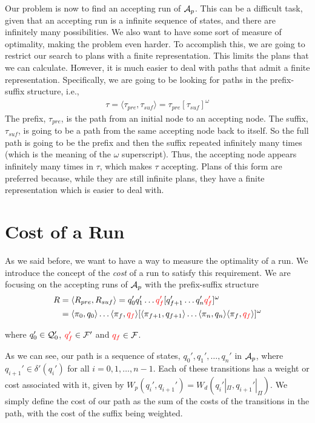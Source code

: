Our problem is now to find an accepting run of $\mathcal{A}_p$. This can be a difficult task, given that an accepting run is a infinite sequence of states, and there are infinitely many possibilities. We also want to have some sort of measure of optimality, making the problem even harder. To accomplish this, we are going to restrict our search to plans with a finite representation. This limits the plans that we can calculate. However, it is much easier to deal with paths that admit a finite representation. Specifically, we are going to be looking for paths in the prefix-suffix structure, i.e.,\
\begin{align*}
\tau = \langle \tau_{pre}, \tau_{suf} \rangle = \tau_{pre} [\tau_{suf}]^\omega
\end{align*}
The prefix, $\tau_{pre}$, is the path from an initial node to an accepting node. The suffix, $\tau_{suf}$, is going to be a path from the same accepting node back to itself. So the full path is going to be the prefix and then the suffix repeated infinitely many times (which is the meaning of the $\omega$ superscript). Thus, the accepting node appears infinitely many times in $\tau$, which makes $\tau$ accepting. Plans of this form are preferred because, while they are still infinite plans, they have a finite representation which is easier to deal with.

\section{Cost of a Run}
As we said before, we want to have a way to measure the optimality of a run. We introduce the concept of the \textit{cost} of a run to satisfy this requirement. We are focusing on the accepting runs of $\mathcal{A}_p$ with the prefix-suffix structure
\begin{align*}
R &= \langle R_{pre}, R_{suf} \rangle = q_0' q_1' \dots {\color{red} q_f'} [q_{f+1}' \dots q_n' {\color{red} q_f'}]^\omega \\
&= \langle \pi_0, q_0 \rangle \dots   \langle {\color{black} \pi_f} , {\color{red} q_f} \rangle [ \langle \pi_{f+1} , q_{f+1} \rangle \dots \langle \pi_{n}, q_n \rangle \langle {\color{black} \pi_f} , {\color{red} q_f} \rangle ]^\omega
\end{align*} 

where $q_0' \in \mathcal{Q}_0'$, ${\color{red} q_f'} \in \mathcal{F}'$ and ${\color{red} q_f} \in \mathcal{F}$. 

As we can see, our path is a sequence of states, $q_0',q_1',\dots,q_n'$ in $\mathcal{A}_p$, where $q_{i+1}' \in \delta' (q_i')$ for all $i=0,1, \dots, n-1$. Each of these transitions has a weight or cost associated with it, given by $W_p(q_i',q_{i+1}') = W_d(q_i'|_\Pi , q_{i+1}'|_\Pi)$. We simply define the cost of our path as the sum of the costs of the transitions in the path, with the cost of the suffix being weighted.

